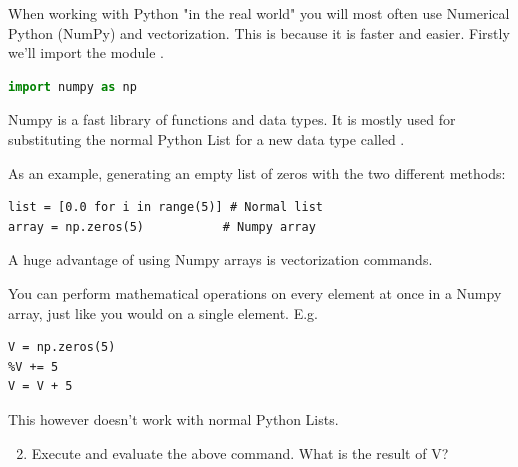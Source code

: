 \documentclass{article}
\begin{document}

When working with Python "in the real world" you will most often use Numerical
Python (NumPy) and vectorization.
This is because it is faster and easier.
Firstly we'll import the module .


\begin{lstlisting}[language=python]
import numpy as np
\end{lstlisting}

Numpy is a fast library of functions and data types.
It is mostly used for substituting the normal Python List for a new data type
called .

As an example, generating an empty list of zeros with the two different methods:

\begin{lstlisting}
list = [0.0 for i in range(5)] # Normal list
array = np.zeros(5)           # Numpy array
\end{lstlisting}

A huge advantage of using Numpy arrays is vectorization commands.
%
%
%
%

You can perform mathematical operations on every element at once in a Numpy array, just like you would on a single element. E.g. 
\begin{lstlisting}
V = np.zeros(5)
%V += 5
V = V + 5
\end{lstlisting}

This however doesn't work with normal Python Lists.

\begin{enumerate}
    \setcounter{enumi}{1}
    \item Execute and evaluate the above command. What is the result of V?
\end{enumerate}
\end{document}
